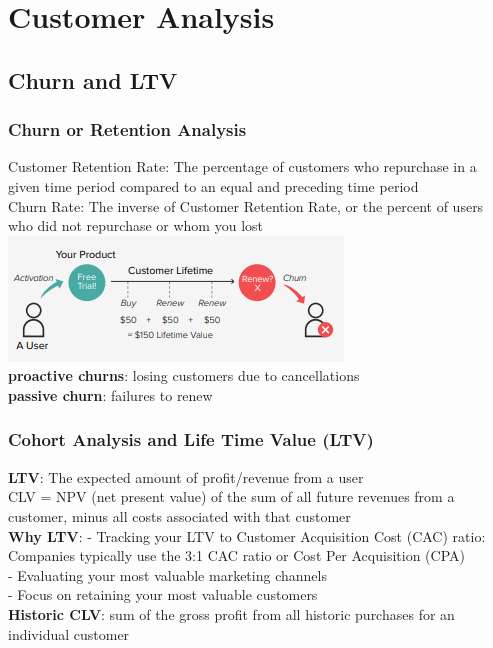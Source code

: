 \documentclass{beamer}
\begin{document}
\section{Customer Analysis}
\subsection{Churn and LTV}

\begin{frame}\frametitle{Churn or Retention Analysis}
Customer Retention Rate: The percentage of customers who repurchase in a given time period compared to an equal and preceding time period\\
Churn Rate: The inverse of Customer Retention Rate, or the percent of users who did not repurchase or whom you lost\\

\includegraphics[scale=0.5]{churn}\\
\textbf{proactive churns}: losing customers due to cancellations\\ \textbf{passive churn}: failures to renew\\
\end{frame}


\begin{frame}\frametitle{Cohort Analysis and Life Time Value (LTV)}
\textbf{LTV}: The expected amount of profit/revenue from a user\\
CLV = NPV (net present value) of the sum of all future revenues from a customer, minus all costs associated with that customer\\
\textbf{Why LTV}:
- Tracking your LTV to Customer Acquisition Cost (CAC) ratio: Companies typically use the 3:1 CAC ratio or Cost Per Acquisition (CPA)\\
- Evaluating your most valuable marketing channels\\
- Focus on retaining your most valuable customers\\
\textbf{Historic CLV}: sum of the gross profit from all historic purchases for an individual customer


\end{frame}
\end{document}
